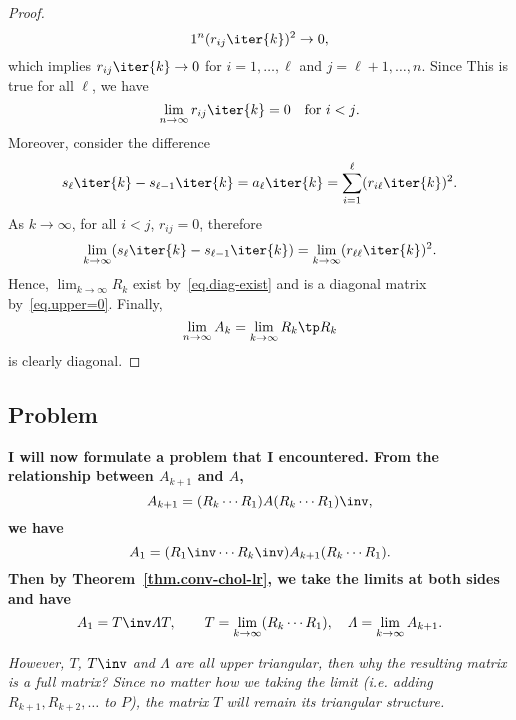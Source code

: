\begin{proof}
\begin{equation}
{  1}^{n} (r_{ij}\iter{k})^{2}  \to 0,
\end{equation}
which implies $r_{ij}\iter{k}\to 0$ for $i = 1,\dots,\ell$ and
$j = \ell + 1,\dots,n$. Since This is true for all $\ell$, we have
\begin{equation}\label{eq.upper=0}
  \lim_{n\to\infty} r_{ij}\iter{k}  = 0 \quad \text{for $i < j$}.
\end{equation}
Moreover, consider the difference
\begin{equation}\notag
  s_{\ell}\iter{k} - s_{\ell - 1}\iter{k} = a_{\ell}\iter{k} =
  \sum_{i=1}^{\ell} (r_{i\ell}\iter{k})^{2}.
\end{equation}
As $k\to\infty$, for all $i < j$, $r_{ij} = 0$, therefore
\begin{equation}\label{eq.diag-exist}
  \lim_{k\to\infty} (s_{\ell}\iter{k} - s_{\ell - 1}\iter{k})
  = \lim_{k \to \infty}(r_{\ell\ell}\iter{k})^{2}.
\end{equation}
Hence, $\lim_{k\to\infty}R_{k}$ exist by~\eqref{eq.diag-exist} and is a
diagonal matrix by~\eqref{eq.upper=0}. Finally,
\begin{equation}\notag
  \lim_{n\to\infty} A_{k} = \lim_{k\to\infty}R_{k}\tp R_{k}
\end{equation}
is clearly diagonal.
\end{proof}

\subsection{Problem}
\bf{I will now formulate a problem that I encountered.}
From the relationship between $A_{k+1}$ and $A$, 
\begin{equation}\notag
  A_{k + 1} = (R_{k}\cdots R_{1}) A (R_{k} \cdots R_{1})\inv,
\end{equation}
we have
\begin{equation}\notag
  A_{1} = (R_{1}\inv \cdots R_{k}\inv)A_{k+1} (R_{k}\cdots R_{1}).
\end{equation}
Then by Theorem~\ref{thm.conv-chol-lr}, we take the limits at both sides
and have
\begin{equation}\notag
  A_{1} = T\inv\varLambda T,\qquad
  T = \lim_{k\to\infty} (R_{k}\cdots R_{1}), \quad
  \varLambda = \lim_{k\to\infty} A_{k+1}.
\end{equation}

\emph{However, $T$, $T\inv$ and $\varLambda$ are all upper triangular, then
why the resulting matrix is a full matrix? Since no matter how we taking
the limit (i.e. adding $R_{k+1},R_{k+2},\dots$ to $P$), the matrix $T$ will
remain its triangular structure.}

